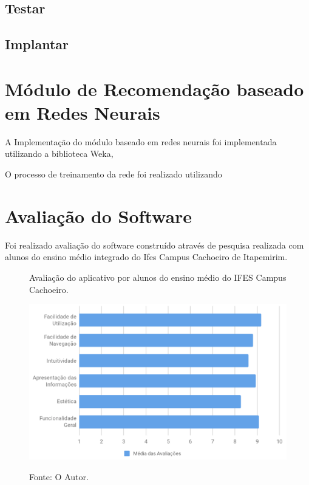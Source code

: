 \subsection{Testar}

\subsection{Implantar}

\section{Módulo de Recomendação baseado em Redes Neurais}

A Implementação do módulo baseado em redes neurais foi implementada utilizando a biblioteca Weka, 

O processo de treinamento da rede foi realizado utilizando 

\section{Avaliação do Software}

Foi realizado avaliação do software construído através de pesquisa realizada com alunos do ensino médio integrado do Ifes Campus Cachoeiro de Itapemirim. 

\begin{figure}[H]
	\caption{Avaliação do aplicativo por alunos do ensino médio do IFES Campus Cachoeiro.}
	\centering %
	\includegraphics[width=15cm]{resources/pesquisa_avaliacao.png} %
	\label{figura:avaliacao}
	\caption*{Fonte: O Autor.}
\end{figure}